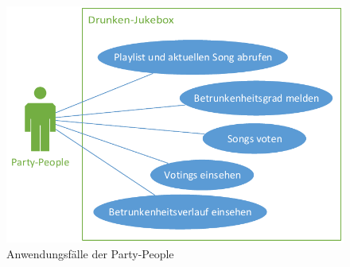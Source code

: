 \begin{figure}[H]
\centering
\includegraphics[width=0.95\linewidth]{Bilder/PartyPeopleUseCase}
\caption{Anwendungsfälle der Party-People}
\label{fig:PartyPeopleUseCase}
\end{figure}
